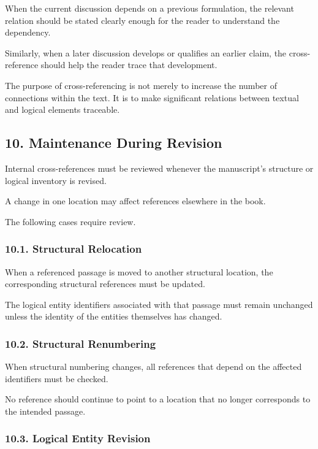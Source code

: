 When the current discussion depends
on a previous formulation, the
relevant relation should be stated
clearly enough for the reader
to understand the dependency.

Similarly, when a later discussion
develops or qualifies an earlier
claim, the cross-reference should
help the reader trace that development.

The purpose of cross-referencing
is not merely to increase the number
of connections within the text.
It is to make significant relations
between textual and logical elements
traceable.


\subsection*{10. Maintenance During Revision}

Internal cross-references must be
reviewed whenever the manuscript's
structure or logical inventory
is revised.

A change in one location may affect
references elsewhere in the book.

The following cases require review.

\subsubsection*{10.1. Structural Relocation}

When a referenced passage is moved
to another structural location,
the corresponding structural
references must be updated.

The logical entity identifiers
associated with that passage
must remain unchanged unless
the identity of the entities
themselves has changed.

\subsubsection*{10.2. Structural Renumbering}

When structural numbering changes,
all references that depend on
the affected identifiers must
be checked.

No reference should continue
to point to a location that
no longer corresponds to the
intended passage.

\subsubsection*{10.3. Logical Entity Revision}

